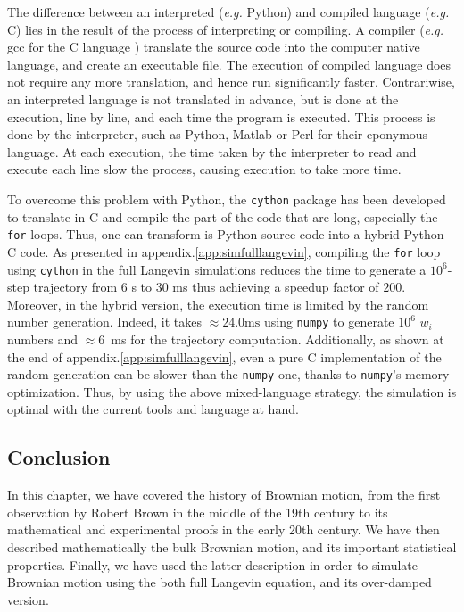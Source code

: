 The difference between an interpreted (\textit{e.g.} Python) and compiled language (\textit{e.g.} C) lies in the result of the process of interpreting or compiling. A compiler (\textit{e.g.} gcc for the C language \href{https://github.com/gcc-mirror/gcc}{\faGithub}) translate the source code into the computer native language, and create an executable file. The execution of compiled language does not require any more translation, and hence run significantly faster. Contrariwise, an interpreted language is not translated in advance, but is done at the execution, line by line, and each time the program is executed. This process is done by the interpreter, such as Python, Matlab or Perl for their eponymous language. At each execution, the time taken by the interpreter to read and execute each line slow the process, causing execution to take more time.

To overcome this problem with Python, the \texttt{cython} package has been developed to translate in C and compile the part of the code that are long, especially the \texttt{for} loops. Thus, one can transform is Python source code into a hybrid Python-C code. As presented in appendix.\ref{app:simfulllangevin}, compiling the \texttt{for} loop using \texttt{cython} in the full Langevin simulations reduces the time to generate a $10^6$-step trajectory from $6$ s to $30$ ms thus achieving a speedup  factor of $200$. Moreover, in the hybrid version, the execution time is limited by the random number generation. Indeed, it takes $ \approx 24.0 \mathrm{ms}$ using \texttt{numpy} to generate $10^6$ $w_i$ numbers and $\approx 6$~ms for the trajectory computation. Additionally, as shown at the end of appendix.\ref{app:simfulllangevin}, even a pure C implementation of the random generation can be slower than the \texttt{numpy} one, thanks to  \texttt{numpy}'s memory optimization. Thus, by using the above mixed-language strategy, the simulation is optimal with the current tools and language at hand.

\subsection{Conclusion}

In this chapter, we have covered the history of Brownian motion, from the first observation by Robert Brown in the middle of the 19th century to its mathematical and experimental proofs in the early 20th century. We have then described mathematically the bulk Brownian motion, and its important statistical properties. Finally, we have used the latter description in order to simulate Brownian motion using the both full Langevin equation, and its over-damped version. 